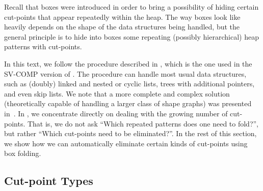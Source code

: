 Recall that boxes were introduced in order to bring a possibility of hiding certain
cut-points that appear repeatedly within the heap. The way boxes look like heavily depends on the shape of the data
structures being handled, but the general principle is to hide into boxes
some repeating (possibly hierarchical) heap patterns with cut-points. 

In this text, we follow the procedure described in \cite{jiri:diza}, 
which is the one used in the SV-COMP version of \forester.
The procedure can handle most usual data structures, such as (doubly) linked and
nested or cyclic lists, trees with additional pointers, and even skip lists.
%
We note that a more complete and complex solution (theoretically capable of
handling a larger class of shape graphs) was presented in~\cite{boxes13}.
%
%
%
%
In \cite{jiri:diza}, we concentrate directly on dealing with the growing
number of cut-points. That is, we do not ask ``Which repeated
patterns does one need to fold?'', but rather ``Which cut-points need to be eliminated?''.
In the rest of this section, we show how we can automatically eliminate certain
kinds of cut-points using box folding.



\subsection{Cut-point Types}

